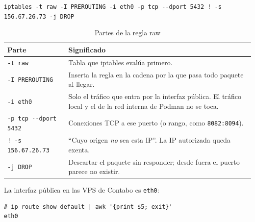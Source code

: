 \begin{lstlisting}
iptables -t raw -I PREROUTING -i eth0 -p tcp --dport 5432 ! -s 156.67.26.73 -j DROP
\end{lstlisting}
\begin{table}[H]
\centering
\caption{Partes de la regla raw}
\small
\begin{tabular}{p{3.6cm}p{10.8cm}}
\toprule
\textbf{Parte} & \textbf{Significado} \\
\midrule
\texttt{-t raw} & Tabla que iptables evalúa primero. \\
\texttt{-I PREROUTING} & Inserta la regla en la cadena por la que pasa todo paquete al llegar. \\
\texttt{-i eth0} & Solo el tráfico que entra por la interfaz pública. El tráfico local y el de la red interna de Podman no se toca. \\
\texttt{-p tcp -{}-dport 5432} & Conexiones TCP a ese puerto (o rango, como \texttt{8082:8094}). \\
\texttt{! -s 156.67.26.73} & ``Cuyo origen \emph{no} sea esta IP''. La IP autorizada queda exenta. \\
\texttt{-j DROP} & Descartar el paquete sin responder; desde fuera el puerto parece no existir. \\
\bottomrule
\end{tabular}
\end{table}

La interfaz pública en las VPS de Contabo es \texttt{eth0}:
\begin{lstlisting}
# ip route show default | awk '{print $5; exit}'
eth0
\end{lstlisting}

